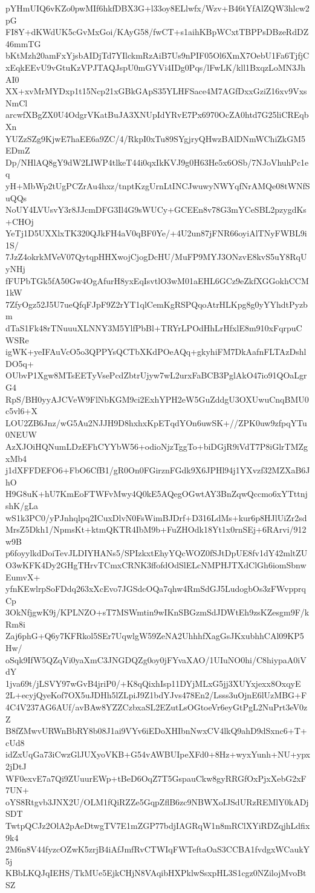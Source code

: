 pYHmUIQ6vKZo0pwMIf6hkfDBX3G+l33oy8ELlwfx/Wzv+B46tYfAlZQW3hlcw2pG
FI8Y+dKWdUK5cGvMxGoi/KAyG58/fwCT+s1aihKBpWCxtTBPPsDBzeRdDZ46mmTG
bKtMzh20amFxYjsbAIDjTd7YIlckmRzAiB7Us9nPIF05Ol6XmX7OebU1Fa6TjfjC
xEqkEEvU9vGtuKzVPJTAQJspU0mGYVi4IDg0Pqs/lFwLK/kll1BxqzLoMN3JhAI0
XX+xvMrMYDxp1t15Ncp21xGBkGApS35YLHFSace4M7AGfDxxGziZ16xv9VxsNmCl
arcwfXBgZX0U4OdgrVKatBuJA3XNUpIdYRvE7Px6970OcZA0htd7G25liCREqbXn
YUZzSZg9KjwE7haEE6a9ZC/4/RkpI0xTu89SYgjryQHwzBAlDNmWChiZkGM5EDmZ
Dp/NHlAQ8gY9dW2LIWP4tlkeT44i0qxIkKVJ9g0H63He5x6OSb/7NJoVhuhPc1eq
yH+MbWp2tUgPCZrAu4hxz/tnptKzgUrnLtINCJwuwyNWYqfNrAMQe08tWNfSuQQs
NoUY4LVUsvY3r8JJcmDFG3Il4G9sWUCy+GCEEn8v78G3mYCeSBL2pzygdKs+CHOj
YeTj1D5UXXlxTK320QJkFH4aV0qBF0Ye/+4U2un87jFNR66oyiAlTNyFWBL9i1S/
7JzZ4okrkMVeV07QytqpHHXwojCjogDcHU/MuFP9MYJ3ONzvE8kvS5uY8RqUyNHj
fFUPbTGk5fA50Gw4OgAfurH8yxEqIsvtlO3wM01aEHL6GCz9eZkfXGGokhCCM1kW
7ZfyOgz52J5U7ueQfqFJpF9Z2rYT1qlCemKgRSPQqoAtrHLKpg8g0yYYhdtPyzbm
dTaS1Fk48rTNuuuXLNNY3M5YlfPbBl+TRYrLPOdHhLrHfxlE8m910xFqrpuCWSRe
igWK+yeIFAuVcO5o3QPPYsQCTbXKdPOeAQq+gkyhiFM7DkAafnFLTAzDshlDO5q+
OUbvP1Xgw8MTsEETyVsePcdZbtrUjyw7wL2urxFaBCB3PglAkO47io91QOaLgrG4
RpS/BH0yyAJCVeW9FlNbKGM9ci2ExhYPH2eW5GuZddgU3OXUwuCnqBMU0c5vl6+X
LOU2ZB6Jnz/wG5Au2NJJH9D8hxhxKpETqdYOn6uwSK+//ZPK0uw9zfpqYTu0NEUW
AzXJOiHQNumLDzEFhCYYbW56+odioNjzTggTo+biDGjR9iVdT7P8iGlrTMZgxMb4
j1dXFFDEFO6+FbO6CfB1/gR0On0FGirznFGdk9X6JPHl94j1YXvzf32MZXaB6JhO
H9G8uK+hU7KmEoFTWFvMwy4Q0kE5AQegOGwtAY3BnZqwQccmo6xYTttnjshK/gLa
wS1k3PC0/yPJnhqlpq2ICuxDlvN0FsWimBJDrf+D316LdMs+kur6p8HJlUiZr2sd
MrsZ5Dkh1/NpmsKt+ktmQKTR4IbM9b+FuZHOdk18Yt1x0rnSEj+6RArvi/912w9B
p6foyylkdDoiTevJLDIYHANs5/SPIzkxtEhyYQcWOZ0fSJtDpUE8fv1dY42mltZU
O3wKFK4Dy2GHgTHrvTCmxCRNK3ffofdOdSlELcNMPHJTXdClGh6iomSbnwEumvX+
yfnKEwlrpSoFDdq263xXcEvo7JGSdcOQa7qhw4RmSdGJ5LudogbOs3zFWvpprqCp
3OkNfjgwK9j/KPLNZO+sT7MSWmtin9wIKnSBGzmSdJDWtEh9zsKZesgm9F/kRm8i
Zaj6phG+Q6y7KFRkol5SEr7UqwlgW59ZeNA2UhhhfXagGsJKxubhhCAl09KP5Hw/
oSqk9IfW5QZqVi0yaXmC3JNGDQZg0oy0jFYvaXAO/1UIuNO0hi/C8hiypaA0iVdY
1jva69t/jLSVY97wGvB4jriP0/+K8qQixhIsp11DYjMLxG5jj3XUYxjexx8OxqyE
2L+ecyjQyeKof7OX5uJDHh5lZLpiJ9Z1bdYJvs478En2/Lsss3uOjnE6lUzMBG+F
4C4V237AG6AUf/avBAw8YZZCzbxaSL2EZutLsOGtoeVr6eyGtPgL2NuPrt3eV0zZ
B8fZMwvURWnBbRY8b08J1ai9VYv6iEDoXHIbnNwxCV4lkQ9ahD9dSxnc6+T+cUd8
idZxUqGa73iCwzGlJUXyoVKB+G54vAWBUIpeXFd0+8Hz+wyxYunh+NU+ypx2jDtJ
WF0exvE7a7Qi9ZUuurEWp+tBeD6OqZ7T5GspauCkw8gyRRGfOxPjxXebG2xF7UN+
oYS8Rtgvb3JNX2U/OLM1fQiRZZe5GqpZflB6zc9NBWXoIJSdURzREMlY0kADjSDT
TwtpQCJz2OlA2pAeDtwgTV7E1mZGP77bdjIAGRqW1n8mRClXYiRDZqjhLdfix9k4
2M6n8V44fyzcOZwK5zrjB4iAfJmfRvCTWIqFWTeftaOaS3CCBA1fvdgxWCaukY5j
KBbLKQJqIEHS/TkMUe5EjkCHjN8VAqibHXPklwSsxpHL3S1cgz0NZilojMvoBtSZ
